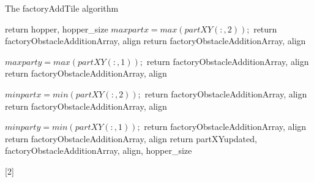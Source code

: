 \documentclass[letterpaper, 10 pt, conference]{ieeeconf}
\begin{document}
 
 
\begin{algorithm} 
\caption{The factoryAddTile algorithm}
\begin{algorithmic}[2]
\newline return hopper, hopper_size
\EndFunction
{}
$maxpartx=max(partXY(:,2));$
return factoryObstacleAdditionArray, align
\EndFunction
\Else
{}
\newline return factoryObstacleAdditionArray, align
\EndFunction
\EndIf
\EndIf

$maxparty=max(partXY(:,1));$
\newline return factoryObstacleAdditionArray, align
\EndFunction
\Else
{}
return factoryObstacleAdditionArray, align
\EndFunction
\EndIf
\EndIf


$minpartx=min(partXY(:,2));$
return factoryObstacleAdditionArray, align
\EndFunction
\Else
{}
\newline return factoryObstacleAdditionArray, align
\EndFunction
\EndIf
\EndIf


$minparty=min(partXY(:,1));$
\newline return factoryObstacleAdditionArray, align
\EndFunction
\Else
{}
return factoryObstacleAdditionArray, align
\EndFunction
\EndIf
\EndIf
\newline return partXYupdated, factoryObstacleAdditionArray, align, hopper_size
\EndFunction
\end{algorithmic}[2]
\end{algorithm}
 
 
 
 
 
\end{document}
